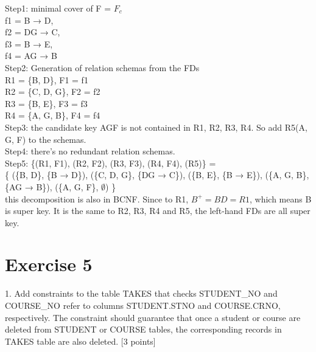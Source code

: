 \documentclass[]{article}
\begin{document}
	\noindent Step1: minimal cover of F = $F_{c}$  \\
	
	f1 = B → D,\\
	
	f2 = DG → C,\\
	
	f3 = B → E, \\
	
	f4 = AG → B  \\
	
	\noindent Step2: Generation of relation schemas from the FDs  \\
	
	R1 = \{B, D\}, F1 = f1 \\
	
	R2 = \{C, D, G\}, F2 = f2 \\
	
	R3 = \{B, E\}, F3 = f3 \\
	
	R4 = \{A, G, B\}, F4 = f4 \\
	
	\noindent Step3: the candidate key AGF is not contained in R1, R2, R3, R4. So add R5(A, G, F) to the schemas. \\
	
	\noindent Step4: there's no redundant relation schemas.  \\
	
	\noindent Step5: \{(R1, F1), (R2, F2), (R3, F3), (R4, F4), (R5)\} = \\
	
	\{
	(\{B, D\}, \{B → D\}), 
	(\{C, D, G\}, \{DG → C\}),
	(\{B, E\}, \{B → E\}),
	(\{A, G, B\}, \{AG → B\}),
	(\{A, G, F\}, $\emptyset$)
	\}  \\
	
	\noindent this decomposition is also in BCNF. Since to R1, $B^{+} = BD = R1$, which means B is super key. It is the same to R2, R3, R4 and R5, the left-hand FDs are all super key. \\
	
	\section{Exercise 5}
	
	1. Add constraints to the table TAKES that checks STUDENT\_NO and COURSE\_NO refer to columns STUDENT.STNO and COURSE.CRNO, respectively. The constraint should guarantee that once a student or course are deleted from STUDENT or COURSE tables, the corresponding records in TAKES table are also deleted. [3 points]  \\
	
\end{document}
